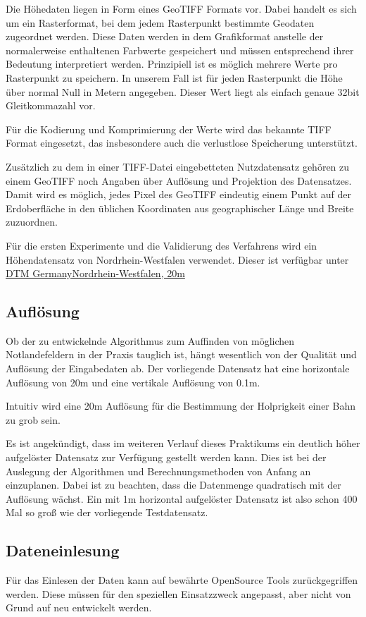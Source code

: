 \documentclass[
11pt, %
a4paper, %
oneside, %
pdfspacing, %
headinclude,
BCOR5mm, %
ngerman, %
bibtotocnumbered,
]{scrartcl}
\begin{document}
Die Höhedaten liegen in Form eines GeoTIFF Formats vor. Dabei handelt es sich um ein Rasterformat, bei dem jedem Rasterpunkt bestimmte Geodaten zugeordnet werden. Diese Daten werden in dem Grafikformat anstelle der normalerweise enthaltenen Farbwerte gespeichert und müssen entsprechend ihrer Bedeutung interpretiert werden. Prinzipiell ist es möglich mehrere Werte pro Rasterpunkt zu speichern. In unserem Fall ist für jeden Rasterpunkt die Höhe über normal Null in Metern angegeben. Dieser Wert liegt als einfach genaue 32bit Gleitkommazahl vor.

Für die Kodierung und Komprimierung der Werte wird das bekannte TIFF Format eingesetzt, das insbesondere auch die verlustlose Speicherung unterstützt.

Zusätzlich zu dem in einer TIFF-Datei eingebetteten Nutzdatensatz gehören zu einem GeoTIFF noch Angaben über Auflösung und Projektion des Datensatzes. Damit wird es möglich, jedes Pixel des GeoTIFF eindeutig einem Punkt auf der Erdoberfläche in den üblichen Koordinaten aus geographischer Länge und Breite zuzuordnen.

Für die ersten Experimente und die Validierung des Verfahrens wird ein Höhendatensatz von Nordrhein-Westfalen verwendet. Dieser ist verfügbar unter \href{http://data.opendataportal.at/dataset/dtm-germany/resource/08d8c183-a4cc-4a7b-84a0-d03f92076ed3}{DTM Germany\textunderscore Nordrhein-Westfalen, 20m}


	\subsection{Auflösung}
	Ob der zu entwickelnde Algorithmus zum Auffinden von möglichen Notlandefeldern in der Praxis tauglich ist, hängt wesentlich von der Qualität und Auflösung der Eingabedaten ab. Der vorliegende Datensatz hat eine horizontale Auflösung von 20m und eine vertikale Auflösung von 0.1m. 
	
	Intuitiv wird eine 20m Auflösung für die Bestimmung der Holprigkeit einer Bahn zu grob sein. 
	
	Es ist angekündigt, dass im weiteren Verlauf dieses Praktikums ein deutlich höher aufgelöster Datensatz zur Verfügung gestellt werden kann. Dies ist bei der Auslegung der Algorithmen und Berechnungsmethoden von Anfang an einzuplanen. Dabei ist zu beachten, dass die Datenmenge quadratisch mit der Auflösung wächst. Ein mit 1m horizontal aufgelöster Datensatz ist also schon 400 Mal so groß wie der vorliegende Testdatensatz.
	
	\subsection{Dateneinlesung}
	Für das Einlesen der Daten kann auf bewährte OpenSource Tools zurückgegriffen werden. Diese müssen für den speziellen Einsatzzweck angepasst, aber nicht von Grund auf neu entwickelt werden.
	
\end{document}
